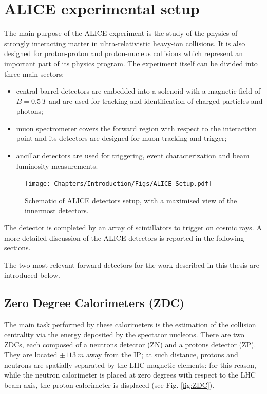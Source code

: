 \section{ALICE experimental setup} %
\label{ALICE_apparatus}
The main purpose of the ALICE experiment is the study of the physics of strongly interacting matter in ultra-relativistic heavy-ion collisions. It is also designed for proton-proton and proton-nucleus collisions which represent an important part of its physics program. The experiment itself can be divided into three main sectors:
\begin{itemize}
    \item central barrel detectors are embedded into a solenoid with a magnetic field of $B = 0.5\ T$ and are used for tracking and identification of charged particles and photons;
    \item muon spectrometer covers the forward region with respect to the interaction point and its detectors are designed for muon tracking and trigger;
    \item ancillar detectors are used for triggering, event characterization and beam luminosity measurements.
\end{itemize}

\begin{figure}[!h]
\begin{center}
\texttt{[image: Chapters/Introduction/Figs/ALICE-Setup.pdf]}
\caption{Schematic of ALICE detectors setup, with a maximised view of the innermost detectors.}
\label{fig:ALICEsetup}
\end{center}
\end{figure}

The detector is completed by an array of scintillators to trigger on cosmic rays.
A more detailed discussion of the ALICE detectors is reported in the following sections.

The two most relevant forward detectors for the work described in this thesis are introduced below.

\subsection{Zero Degree Calorimeters (ZDC)}
The main task performed by these calorimeters is the estimation of the collision centrality via the energy deposited by the spectator nucleons. 
There are two ZDCs, each composed of a neutrons detector (ZN) and a protons detector (ZP).
They are located $\pm113\ m$ away from the IP; at such distance, protons and neutrons are spatially separated by the LHC magnetic elements: for this reason, while the neutron calorimeter is placed at zero degrees with respect to the LHC beam axis, the proton calorimeter is displaced (see Fig. \ref{fig:ZDC}).

